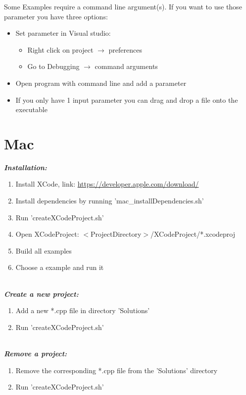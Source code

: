 \documentclass[]{article}
\begin{document}
Some Examples require a command line argument(s). If you want to use those parameter you have three options:
\begin{itemize}
	\item Set parameter in Visual studio:
	\begin{itemize}
		\item Right click on project $\rightarrow$ preferences
		\item Go to Debugging $\rightarrow$ command arguments
	\end{itemize}
	\item Open program with command line and add a parameter
	\item If you only have 1 input parameter you can drag and drop a file onto the executable
\end{itemize}


\newpage
\section{Mac}\label{Mac}

\textit{\textbf{Installation:}}
\begin{enumerate}
	\item Install XCode, link: \url{https://developer.apple.com/download/}
	\item Install dependencies by running 'mac\_installDependencies.sh'
	\item Run 'createXCodeProject.sh'
	\item Open XCodeProject: $<$ProjectDirectory$>$/XCodeProject/*.xcodeproj
	\item Build all examples
	\item Choose a example and run it 
\end{enumerate}

\mbox{} \\
\textit{\textbf{Create a new project:}}
\begin{enumerate}
\item Add a new *.cpp file in directory 'Solutions'
\item Run 'createXCodeProject.sh' 
\end{enumerate}

\mbox{} \\
\textit{\textbf{Remove a project:}}
\begin{enumerate}
\item Remove the corresponding *.cpp file from the 'Solutions' directory
\item Run 'createXCodeProject.sh' 
\end{enumerate}
\end{document}
